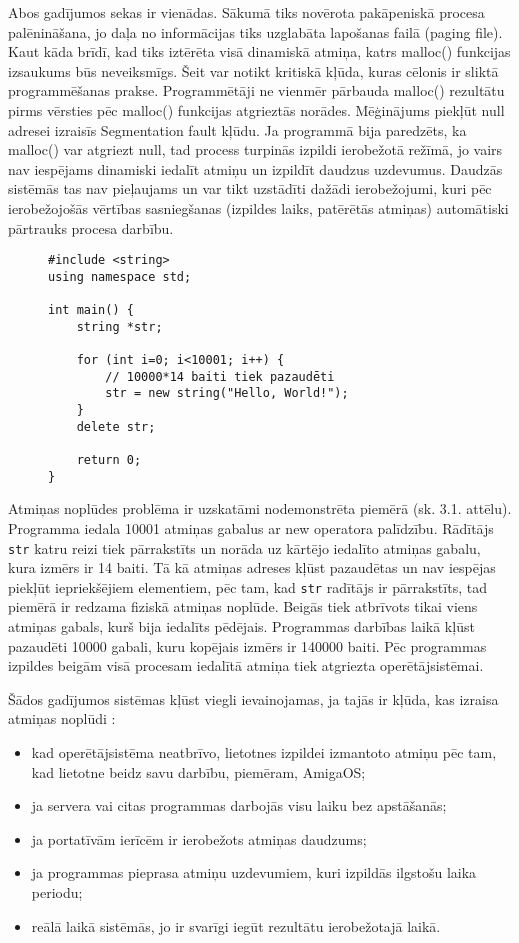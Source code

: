 Abos gadījumos sekas ir vienādas.
Sākumā tiks novērota pakāpeniskā procesa palēnināšana, jo daļa no informācijas tiks uzglabāta lapošanas failā (paging file).
Kaut kāda brīdī, kad tiks iztērēta visā dinamiskā atmiņa, katrs malloc() funkcijas izsaukums būs neveiksmīgs.
Šeit var notikt kritiskā kļūda, kuras cēlonis ir sliktā programmēšanas prakse.
Programmētāji ne vienmēr pārbauda malloc() rezultātu pirms vērsties pēc malloc() funkcijas atgrieztās norādes.  
Mēģinājums piekļūt null adresei  izraisīs Segmentation fault kļūdu.
Ja programmā bija paredzēts, ka malloc() var atgriezt null, tad process turpinās izpildi ierobežotā režīmā, jo vairs nav iespējams dinamiski iedalīt atmiņu un izpildīt daudzus uzdevumus. 
Daudzās sistēmās tas nav pieļaujams un var tikt uzstādīti dažādi ierobežojumi, kuri pēc ierobežojošās vērtības sasniegšanas (izpildes laiks, patērētās atmiņas) automātiski pārtrauks procesa darbību. 

\begin{figure}[h]
\begin{lstlisting}
#include <string>
using namespace std;

int main() {
    string *str;

    for (int i=0; i<10001; i++) {
        // 10000*14 baiti tiek pazaudēti
        str = new string("Hello, World!");
    }
    delete str;

    return 0;
}
\end{lstlisting}
\caption{\textbf{\fontsize{11}{12}\selectfont {Atmiņas noplūde, C++}}}
\end{figure}

Atmiņas noplūdes problēma ir uzskatāmi nodemonstrēta piemērā (sk. 3.1. attēlu).
Programma  iedala 10001 atmiņas gabalus ar new operatora palīdzību. 
Rādītājs \texttt{str} katru reizi tiek pārrakstīts un norāda uz kārtējo iedalīto atmiņas gabalu, kura izmērs ir 14 baiti.
Tā kā atmiņas adreses kļūst pazaudētas un nav iespējas piekļūt iepriekšējiem elementiem, pēc tam, kad  \texttt{str} radītājs ir pārrakstīts, tad piemērā ir redzama fiziskā atmiņas noplūde.
Beigās tiek atbrīvots tikai viens atmiņas gabals, kurš bija iedalīts pēdējais. 
Programmas darbības laikā kļūst pazaudēti 10000 gabali, kuru kopējais izmērs ir 140000 baiti.
 Pēc programmas izpildes beigām visā procesam iedalītā atmiņa tiek atgriezta operētājsistēmai.


Šādos gadījumos sistēmas kļūst viegli ievainojamas, ja tajās ir kļūda, kas izraisa atmiņas noplūdi \cite{RTTV}: 
\begin{itemize}
\item { kad operētājsistēma neatbrīvo, lietotnes izpildei izmantoto atmiņu pēc tam, kad lietotne beidz savu darbību, piemēram, AmigaOS;}
\item { ja servera vai citas programmas darbojās visu laiku bez apstāšanās; }
\item { ja portatīvām ierīcēm ir ierobežots atmiņas daudzums;}
\item { ja programmas pieprasa atmiņu uzdevumiem, kuri izpildās ilgstošu laika periodu; }
\item { reālā laikā sistēmās, jo ir svarīgi iegūt rezultātu ierobežotajā laikā. }
\end{itemize}

